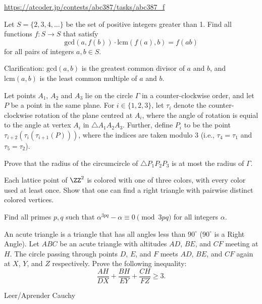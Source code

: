 \documentclass[11pt]{scrartcl}
\begin{document}
\begin{problem}[AC ABC387F]
\url{https://atcoder.jp/contests/abc387/tasks/abc387_f}
\end{problem}
\begin{problem}[Rioplatense 2024/3.5]
    Let $S = \{2, 3, 4, \dots\}$ be the set of positive integers greater than 1. Find all functions $f : S \to S$ that satisfy
\[
\text{gcd}(a, f(b)) \cdot \text{lcm}(f(a), b) = f(ab)
\]for all pairs of integers $a, b \in S$.

Clarification: $\text{gcd}(a,b)$ is the greatest common divisor of $a$ and $b$, and $\text{lcm}(a,b)$ is the least common multiple of $a$ and $b$.
\end{problem}
\begin{problem}[India 2024/5]
Let points $A_1$, $A_2$ and $A_3$ lie on the circle $\Gamma$ in a counter-clockwise order, and let $P$ be a point in the same plane. For $i \in \{1,2,3\}$, let $\tau_i$ denote the counter-clockwise rotation of the plane centred at $A_i$, where the angle of rotation is equial to the angle at vertex $A_i$ in $\triangle A_1A_2A_3$. Further, define $P_i$ to be the point $\tau_{i+2}(\tau_{i}(\tau_{i+1}(P)))$, where the indices are taken modulo $3$ (i.e., $\tau_4 = \tau_1$ and $\tau_5 = \tau_2$).

Prove that the radius of the circumcircle of $\triangle P_1P_2P_3$ is at most the radius of $\Gamma$.
\end{problem}
\begin{problem}
  Each lattice point of $\ZZ^2$ is colored with one of three colors,
  with every color used at least once.
  Show that one can find a right triangle with pairwise distinct colored vertices.
\end{problem}
\begin{problem}
Find all primes $ p,q $ such that $ \alpha^{3pq} -\alpha \equiv 0 \pmod {3pq} $ for all integers $ \alpha $.
\end{problem}
\begin{problem}[Canada 2023/3]
    An acute triangle is a triangle that has all angles less than $90^{\circ}$ ($90^{\circ}$ is a Right Angle). Let $ABC$ be an acute triangle with altitudes $AD$, $BE$, and $CF$ meeting at $H$. The circle passing through points $D$, $E$, and $F$ meets $AD$, $BE$, and $CF$ again at $X$, $Y$, and $Z$ respectively. Prove the following inequality:$$\frac{AH}{DX}+\frac{BH}{EY}+\frac{CH}{FZ} \geq 3.$$
\end{problem}
\begin{problem}
Leer/Aprender Cauchy
\end{problem}
\end{document}

